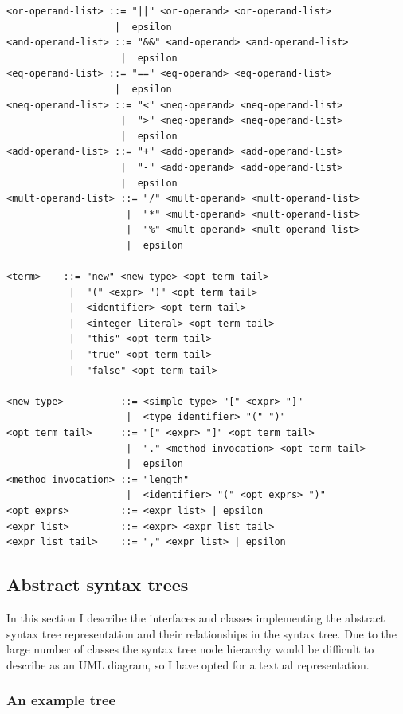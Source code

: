 \documentclass[a4paper,11pt]{article}
\begin{document}
\begin{verbatim}
<or-operand-list> ::= "||" <or-operand> <or-operand-list>
                   |  epsilon
<and-operand-list> ::= "&&" <and-operand> <and-operand-list>
                    |  epsilon
<eq-operand-list> ::= "==" <eq-operand> <eq-operand-list>
                   |  epsilon
<neq-operand-list> ::= "<" <neq-operand> <neq-operand-list>
                    |  ">" <neq-operand> <neq-operand-list>
                    |  epsilon
<add-operand-list> ::= "+" <add-operand> <add-operand-list>
                    |  "-" <add-operand> <add-operand-list>
                    |  epsilon
<mult-operand-list> ::= "/" <mult-operand> <mult-operand-list>
                     |  "*" <mult-operand> <mult-operand-list>
                     |  "%" <mult-operand> <mult-operand-list>
                     |  epsilon

<term>    ::= "new" <new type> <opt term tail>
           |  "(" <expr> ")" <opt term tail>
           |  <identifier> <opt term tail>
           |  <integer literal> <opt term tail>
           |  "this" <opt term tail>
           |  "true" <opt term tail>
           |  "false" <opt term tail>

<new type>          ::= <simple type> "[" <expr> "]"
                     |  <type identifier> "(" ")"
<opt term tail>     ::= "[" <expr> "]" <opt term tail>
                     |  "." <method invocation> <opt term tail>
                     |  epsilon
<method invocation> ::= "length"
                     |  <identifier> "(" <opt exprs> ")"
<opt exprs>         ::= <expr list> | epsilon
<expr list>         ::= <expr> <expr list tail>
<expr list tail>    ::= "," <expr list> | epsilon

\end{verbatim}

\subsection{Abstract syntax trees}

In this section I describe the interfaces and classes implementing the abstract syntax tree representation and their relationships in the syntax tree. Due to the large number of classes the syntax tree node hierarchy would be difficult to describe as an UML diagram, so I have opted for a textual representation.

\subsubsection{An example tree}
\end{document}
